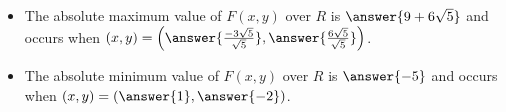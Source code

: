 \documentclass{ximera}
\begin{document}
\begin{exercise}
\begin{exercise}
\begin{exercise}
\begin{itemize}
\item The absolute maximum value of $F(x,y)$ over $R$ is $\answer{ 9 +6\sqrt{5} }$ and occurs when $(x,y) = \left( \answer{\frac{-3\sqrt{5}}{\sqrt{5}}},  \answer{\frac{6\sqrt{5}}{\sqrt{5}}} \right) $.
\item The absolute minimum value of $F(x,y)$ over $R$ is $\answer{ -5 }$ and occurs when $(x,y) = \left(\answer{1},\answer{-2}\right)$.
\end{itemize}
\end{exercise}


\end{exercise}


\end{exercise}
\end{document}
